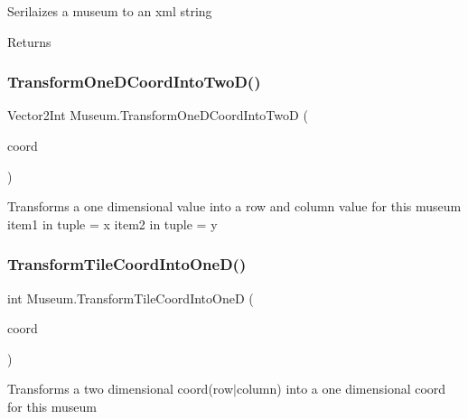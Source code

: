 Serilaizes a museum to an xml string 

\begin{DoxyReturn}{Returns}

\end{DoxyReturn}
\mbox{\label{class_museum_a458545a518b026779c23e6c5b477bbf4}} 
\subsubsection{\texorpdfstring{Transform\+One\+D\+Coord\+Into\+Two\+D()}{TransformOneDCoordIntoTwoD()}}
{\footnotesize\ttfamily Vector2\+Int Museum.\+Transform\+One\+D\+Coord\+Into\+TwoD (\begin{DoxyParamCaption}\item[{int}]{coord }\end{DoxyParamCaption})}



Transforms a one dimensional value into a row and column value for this museum item1 in tuple = x item2 in tuple = y 

\mbox{\label{class_museum_a405e60db962417dde46d46180cbf81df}} 
\subsubsection{\texorpdfstring{Transform\+Tile\+Coord\+Into\+One\+D()}{TransformTileCoordIntoOneD()}}
{\footnotesize\ttfamily int Museum.\+Transform\+Tile\+Coord\+Into\+OneD (\begin{DoxyParamCaption}\item[{Vector2\+Int}]{coord }\end{DoxyParamCaption})}



Transforms a two dimensional coord(row$\vert$column) into a one dimensional coord for this museum 


